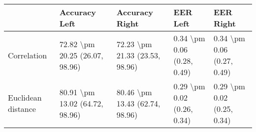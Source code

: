 \begin{tabular}{lllll}
\toprule
{} &                   Accuracy Left &                  Accuracy Right &                    EER Left &                   EER Right \\
\midrule
Correlation        &  72.82 \textbackslash pm 20.25 (26.07, 98.96) &  72.23 \textbackslash pm 21.33 (23.53, 98.96) &  0.34 \textbackslash pm 0.06 (0.28, 0.49) &  0.34 \textbackslash pm 0.06 (0.27, 0.49) \\
Euclidean distance &  80.91 \textbackslash pm 13.02 (64.72, 98.96) &  80.46 \textbackslash pm 13.43 (62.74, 98.96) &  0.29 \textbackslash pm 0.02 (0.26, 0.34) &  0.29 \textbackslash pm 0.02 (0.25, 0.34) \\
\bottomrule
\end{tabular}
